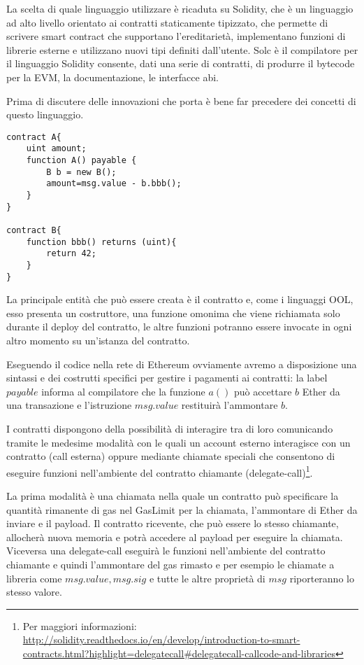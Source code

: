 	La scelta di quale linguaggio utilizzare è ricaduta su Solidity, che è un linguaggio ad alto livello orientato ai contratti staticamente tipizzato, che permette di scrivere smart contract che supportano l'ereditarietà, implementano funzioni di librerie esterne e utilizzano nuovi tipi definiti dall'utente. Solc è il compilatore per il linguaggio Solidity consente, dati una serie di contratti, di produrre il bytecode per la EVM, la documentazione, le interfacce abi. %
	
	Prima di discutere delle innovazioni che porta è bene far precedere dei concetti di questo linguaggio.
		
\begin{lstlisting}
contract A{
	uint amount;
	function A() payable {
		B b = new B();
		amount=msg.value - b.bbb();
	}
}

contract B{
	function bbb() returns (uint){
		return 42;
	}
}
\end{lstlisting}
		
		La principale entità che può essere creata è il contratto e, come i linguaggi OOL, esso presenta un costruttore, una funzione omonima che viene richiamata solo durante il deploy del contratto, le altre funzioni potranno essere invocate in ogni altro momento su un'istanza del contratto.
		
		Eseguendo il codice nella rete di Ethereum ovviamente avremo a disposizione una sintassi e dei costrutti specifici per gestire i pagamenti ai contratti: la label $payable$ informa al compilatore che la funzione $a()$ può accettare $b$ Ether da una transazione e l'istruzione $msg.value$ restituirà l'ammontare $b$.
		
		I contratti dispongono della possibilità di interagire tra di loro comunicando tramite le medesime modalità con le quali un account esterno interagisce con un contratto (call esterna) oppure mediante chiamate speciali che consentono di eseguire funzioni nell'ambiente del contratto chiamante (delegate-call)\footnote{Per maggiori informazioni: \url{http://solidity.readthedocs.io/en/develop/introduction-to-smart-contracts.html?highlight=delegatecall\#delegatecall-callcode-and-libraries}}.
		
		La prima modalità è una chiamata nella quale un contratto può specificare la quantità rimanente di gas nel GasLimit per la chiamata, l'ammontare di Ether da inviare e il payload. Il contratto ricevente, che può essere lo stesso chiamante, allocherà nuova memoria e potrà accedere al payload per eseguire la chiamata.
		Viceversa una delegate-call eseguirà le funzioni nell'ambiente del contratto chiamante e quindi l'ammontare del gas rimasto e per esempio le chiamate a libreria come $msg.value, msg.sig$ e tutte le altre proprietà di $msg$ riporteranno lo stesso valore.
		
